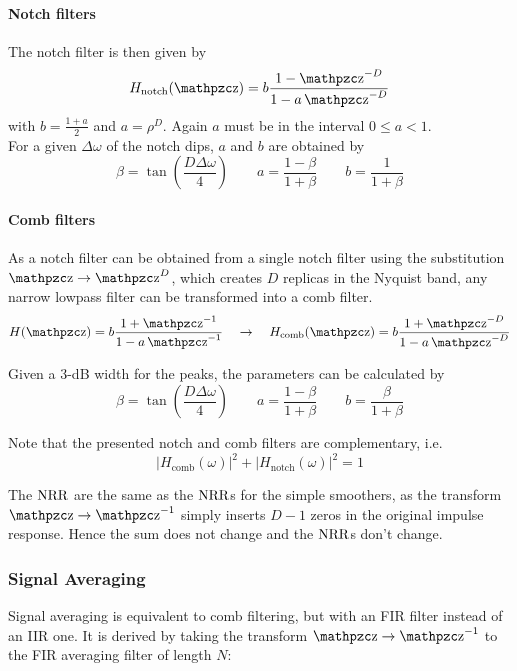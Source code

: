 \paragraph{Notch filters}The notch filter is then given by
\begin{equation*}
	H_{\text{notch}}(\z) = b \frac{1-\z^{-D}}{1-a\z^{-D}}
\end{equation*}
with $b = \frac{1+a}{2}$ and $a = \rho^D$. Again $a$ must be in the interval
$0 \leq a < 1$. \\

For a given $\Delta\omega$ of the notch dips, $a$ and $b$  are obtained by
\begin{equation*}
	\beta = \tan\left(\frac{D\Delta\omega}{4}\right) \qquad a = \frac{1-\beta}{1+\beta} \qquad b = \frac{1}{1+\beta}
\end{equation*}

\paragraph{Comb filters}
As a notch filter can be obtained from a single notch filter using the
substitution $\z \to \z^D$, which creates $D$ replicas in the Nyquist band,
any narrow lowpass filter can be transformed into a comb filter.
\begin{equation*}
	H(\z) = b \frac{1+\z^{-1}}{1-a\z^{-1}} \quad \to \quad
	H_{\text{comb}}(\z) = b \frac{1+\z^{-D}}{1-a\z^{-D}}
\end{equation*}

Given a 3-dB width for the peaks, the parameters can be calculated by
\begin{equation*}
	\beta = \tan\left(\frac{D\Delta\omega}{4}\right) \qquad 
	a = \frac{1-\beta}{1+\beta} \qquad b = \frac{\beta}{1+\beta}
\end{equation*}

Note that the presented notch and comb filters are complementary, i.e.
\begin{equation*}
	\left|H_{\text{comb}}(\omega)\right|^2 + \left|H_{\text{notch}}(\omega)\right|^2 = 1
\end{equation*}

The $\operatorname{\text{NRR}}$ are the same as the $\operatorname{\text{NRR}}$s for the simple smoothers, as the
transform $\z \to \z^{-1}$ simply inserts $D-1$ zeros in the original
impulse response. Hence the sum does not change and the $\operatorname{\text{NRR}}$s don't change.


\subsubsection{Signal Averaging}
Signal averaging is equivalent to comb filtering, but with an FIR filter
instead of an IIR one. It is derived by taking the transform $\z \to \z^{-1}$
to the FIR averaging filter of length $N$:

